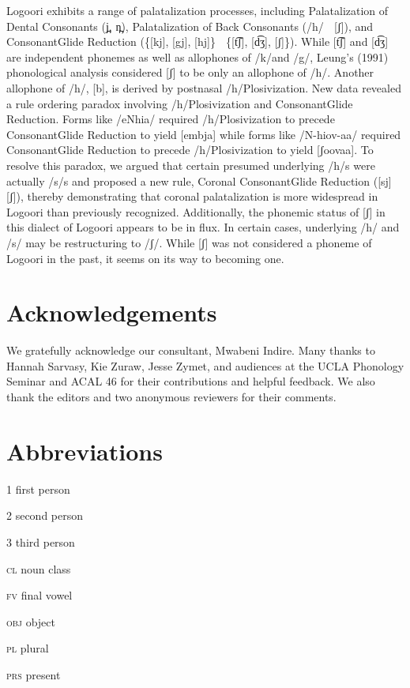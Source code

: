 \documentclass[output=paper]{langsci/langscibook}
\begin{document}
Logoori exhibits a range of palatalization processes, including Palatalization of Dental Consonants (j̪, n̪), Palatalization of Back Consonants (/h/  [ʃ]), and ConsonantGlide Reduction (\{[kj], [gj], [hj]\}  \{[t͡ʃ], [d͡ʒ], [ʃ]\}). While [t͡ʃ] and [d͡ʒ] are independent phonemes as well as allophones of /k/and /g/, Leung’s (1991) phonological analysis considered [ʃ] to be only an allophone of /h/. Another allophone of /h/, [b], is derived by postnasal /h/Plosivization. New data revealed a rule ordering paradox involving /h/Plosivization and ConsonantGlide Reduction. Forms like /eNhia/ required /h/Plosivization to precede ConsonantGlide Reduction to yield [embja] while forms like /N-hiov-aa/ required ConsonantGlide Reduction to precede /h/Plosivization to yield [ʃoovaa]. To resolve this paradox, we argued that certain presumed underlying /h/s were actually /s/s and proposed a new rule, Coronal ConsonantGlide Reduction ([sj]  [ʃ]), thereby demonstrating that coronal palatalization is more widespread in Logoori than previously recognized. Additionally, the phonemic status of [ʃ] in this dialect of Logoori appears to be in flux. In certain cases, underlying /h/ and /s/ may be restructuring to /ʃ/. While [ʃ] was not considered a phoneme of Logoori in the past, it seems on its way to becoming one.

\section{Acknowledgements} We gratefully acknowledge our consultant, Mwabeni Indire. Many thanks to Hannah Sarvasy, Kie Zuraw, Jesse Zymet, and audiences at the UCLA Phonology Seminar and ACAL 46 for their contributions and helpful feedback. We also thank the editors and two anonymous reviewers for their comments.

\section*{Abbreviations}

\textsc{1}    first person

\textsc{2}    second person

\textsc{3}    third person

\textsc{cl}    noun class

\textsc{fv}    final vowel

\textsc{obj}    object

\textsc{pl}    plural

\textsc{prs}    present
\end{document}
